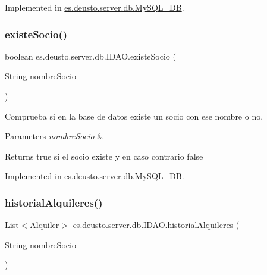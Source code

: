 Implemented in \mbox{\hyperlink{classes_1_1deusto_1_1server_1_1db_1_1_my_s_q_l___d_b_ab767d728176cb3c56ef6a7a3b787bff0}{es.\+deusto.\+server.\+db.\+My\+S\+Q\+L\+\_\+\+DB}}.

\mbox{\label{interfacees_1_1deusto_1_1server_1_1db_1_1_i_d_a_o_a376e9e8f235b13262d5b63541aeb3fd1}} 
\subsubsection{\texorpdfstring{existeSocio()}{existeSocio()}}
{\footnotesize\ttfamily boolean es.\+deusto.\+server.\+db.\+I\+D\+A\+O.\+existe\+Socio (\begin{DoxyParamCaption}\item[{String}]{nombre\+Socio }\end{DoxyParamCaption})}

Comprueba si en la base de datos existe un socio con ese nombre o no. 
\begin{DoxyParams}{Parameters}
{\em nombre\+Socio} & \\
\hline
\end{DoxyParams}
\begin{DoxyReturn}{Returns}
true si el socio existe y en caso contrario false 
\end{DoxyReturn}


Implemented in \mbox{\hyperlink{classes_1_1deusto_1_1server_1_1db_1_1_my_s_q_l___d_b_a96e7c2f7a533e8d9d4802ac1ee54dfdf}{es.\+deusto.\+server.\+db.\+My\+S\+Q\+L\+\_\+\+DB}}.

\mbox{\label{interfacees_1_1deusto_1_1server_1_1db_1_1_i_d_a_o_a693bc26b74c79a8e02bcfc4ca472f078}} 
\subsubsection{\texorpdfstring{historialAlquileres()}{historialAlquileres()}}
{\footnotesize\ttfamily List$<$\mbox{\hyperlink{classes_1_1deusto_1_1client_1_1data_1_1_alquiler}{Alquiler}}$>$ es.\+deusto.\+server.\+db.\+I\+D\+A\+O.\+historial\+Alquileres (\begin{DoxyParamCaption}\item[{String}]{nombre\+Socio }\end{DoxyParamCaption})}

